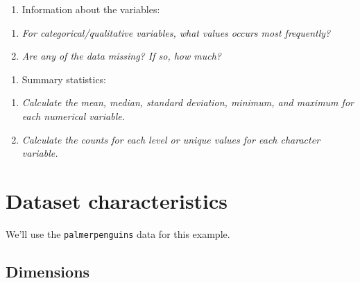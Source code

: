 \documentclass[letterpaper,9pt,twoside,]{pinp}
\providecommand{\tightlist}{%
  \setlength{\itemsep}{0pt}\setlength{\parskip}{0pt}}
\begin{document}
\begin{enumerate}
\def\labelenumi{\arabic{enumi}.}
\setcounter{enumi}{2}
\tightlist
\item
  Information about the variables:\\
\end{enumerate}

\begin{enumerate}
\def\labelenumi{\alph{enumi}.}
\tightlist
\item
  \emph{For categorical/qualitative variables, what values occurs most
  frequently?}\\
\item
  \emph{Are any of the data missing? If so, how much?}\\
\end{enumerate}

\begin{enumerate}
\def\labelenumi{\arabic{enumi}.}
\setcounter{enumi}{3}
\tightlist
\item
  Summary statistics:
\end{enumerate}

\begin{enumerate}
\def\labelenumi{\alph{enumi}.}
\tightlist
\item
  \emph{Calculate the mean, median, standard deviation, minimum, and
  maximum for each numerical variable.}\\
\item
  \emph{Calculate the counts for each level or unique values for each
  character variable.}
\end{enumerate}

\hypertarget{dataset-characteristics}{%
\section{Dataset characteristics}\label{dataset-characteristics}}

We'll use the \texttt{palmerpenguins} data for this example.

\begin{Shaded}
\begin{Highlighting}[]
\OtherTok{\textless{}{-}}\SpecialCharTok{::}
\end{Highlighting}
\end{Shaded}

\hypertarget{dimensions}{%
\subsection{Dimensions}\label{dimensions}}
\end{document}
